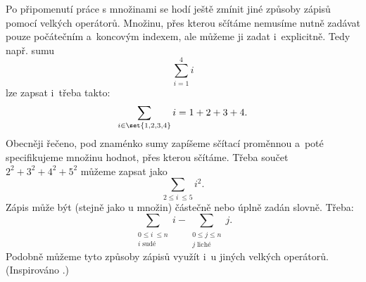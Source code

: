 Po připomenutí práce s množinami se hodí ještě zmínit jiné způsoby zápisů pomocí velkých operátorů. Množinu, přes kterou sčítáme nemusíme nutně zadávat pouze počátečním a~koncovým indexem, ale můžeme ji zadat i~explicitně. Tedy např. sumu
\begin{equation*}
    \sum_{i=1}^{4}{i}
\end{equation*}
lze zapsat i~třeba takto:
\begin{equation*}
    \sum_{i \in \set{1,2,3,4}}{i}=1+2+3+4.
\end{equation*}
Obecněji řečeno, pod znaménko sumy zapíšeme sčítací proměnnou a~poté specifikujeme množinu hodnot, přes kterou sčítáme. Třeba součet $2^2+3^2+4^2+5^2$ můžeme zapsat jako
\begin{equation*}
    \sum_{2 \leq i~\leq 5}{i^2}.
\end{equation*}
Zápis může být (stejně jako u množin) částečně nebo úplně zadán slovně. Třeba:
\begin{equation*}
    \sum_{\substack{0 \leq i~\leq n\\ i\;\text{sudé}}}{i}-\sum_{\substack{0 \leq j \leq n\\ j\;\text{liché}}}{j}.
\end{equation*}
Podobně můžeme tyto způsoby zápisů využít i~u jiných velkých operátorů. (Inspirováno \cite{MatousekNesetril2009}.)